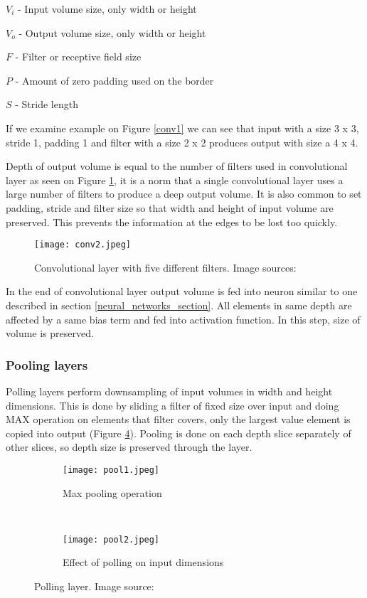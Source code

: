 $V_{i}$ - Input volume size, only width or height

$V_{o}$ - Output volume size, only width or height

$F$ - Filter or receptive field size

$P$ - Amount of zero padding used on the border

$S$ - Stride length

If we examine example on Figure \ref{conv1} we can see that input with a size 3 x 3, stride 1, padding 1 and filter with a size 2 x 2 produces output with size a 4 x 4.

Depth of output volume is equal to the number of filters used in convolutional layer as seen on Figure \ref{conv2}, it is a norm that a single convolutional layer uses a large number of filters to produce a deep output volume\cite{cs231n}.
It is also common to set padding, stride and filter size so that width and height of input volume are preserved.
This prevents the information at the edges to be lost too quickly\cite{cs231n}.


\begin{figure}[ht] 
    \centering
    \texttt{[image: conv2.jpeg]} 
    \caption{Convolutional layer with five different filters. Image sources: \cite{conv_layer_img}\cite{cs231n}}
    \label{conv2}
\end{figure}

In the end of convolutional layer output volume is fed into neuron similar to one described in section \ref{neural_networks_section}. 
All elements in same depth are affected by a same bias term and fed into activation function.
In this step, size of volume is preserved.

\subsubsection{ Pooling layers}

Polling layers perform downsampling of input volumes in width and height dimensions.
This is done by sliding a filter of fixed size over input and doing MAX operation on elements that filter covers, only the largest value element is copied into output (Figure \ref{pool_layer}).
Pooling is done on each depth slice separately of other slices, so depth size is preserved through the layer.

\begin{figure}[ht] 
    \begin{subfigure}[b]{0.5\textwidth}
        \centering
        \texttt{[image: pool1.jpeg]} 
        \caption{Max pooling operation}
        \label{pool1}
    \end{subfigure}
    \unskip\ \vrule\ 
    \begin{subfigure}[b]{0.5\textwidth}
        \centering
        \texttt{[image: pool2.jpeg]} 
        \caption{ Effect of polling on input dimensions}
        \label{pool2}
    \end{subfigure}
    \caption{ Polling layer. Image source: \cite{cs231n}}
    \label{pool_layer}
\end{figure}

